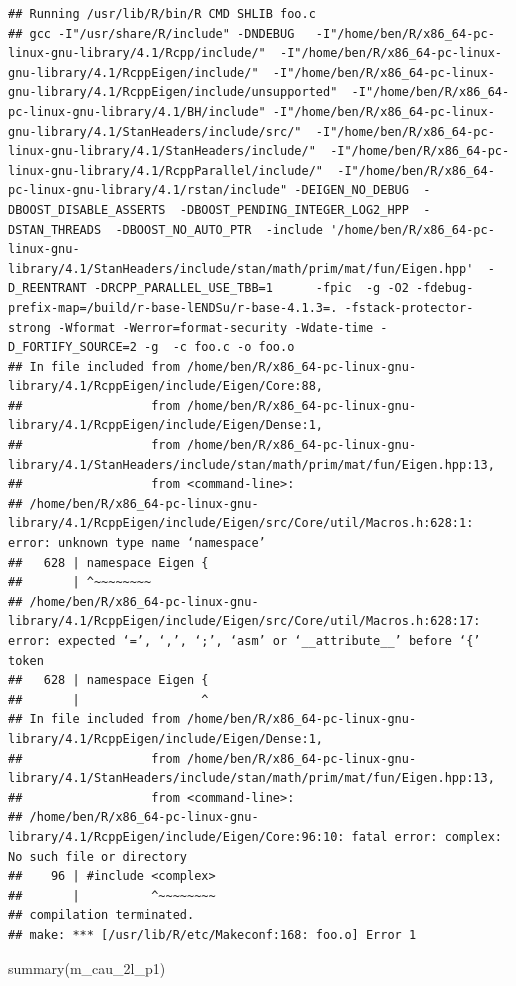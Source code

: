 \documentclass[
]{article}
\newenvironment{Shaded}{\begin{snugshade}}{\end{snugshade}}
\newcommand{\FunctionTok}[1]{\textcolor[rgb]{0.00,0.00,0.00}{#1}}
\newcommand{\NormalTok}[1]{#1}
\begin{document}
\begin{verbatim}
## Running /usr/lib/R/bin/R CMD SHLIB foo.c
## gcc -I"/usr/share/R/include" -DNDEBUG   -I"/home/ben/R/x86_64-pc-linux-gnu-library/4.1/Rcpp/include/"  -I"/home/ben/R/x86_64-pc-linux-gnu-library/4.1/RcppEigen/include/"  -I"/home/ben/R/x86_64-pc-linux-gnu-library/4.1/RcppEigen/include/unsupported"  -I"/home/ben/R/x86_64-pc-linux-gnu-library/4.1/BH/include" -I"/home/ben/R/x86_64-pc-linux-gnu-library/4.1/StanHeaders/include/src/"  -I"/home/ben/R/x86_64-pc-linux-gnu-library/4.1/StanHeaders/include/"  -I"/home/ben/R/x86_64-pc-linux-gnu-library/4.1/RcppParallel/include/"  -I"/home/ben/R/x86_64-pc-linux-gnu-library/4.1/rstan/include" -DEIGEN_NO_DEBUG  -DBOOST_DISABLE_ASSERTS  -DBOOST_PENDING_INTEGER_LOG2_HPP  -DSTAN_THREADS  -DBOOST_NO_AUTO_PTR  -include '/home/ben/R/x86_64-pc-linux-gnu-library/4.1/StanHeaders/include/stan/math/prim/mat/fun/Eigen.hpp'  -D_REENTRANT -DRCPP_PARALLEL_USE_TBB=1      -fpic  -g -O2 -fdebug-prefix-map=/build/r-base-lENDSu/r-base-4.1.3=. -fstack-protector-strong -Wformat -Werror=format-security -Wdate-time -D_FORTIFY_SOURCE=2 -g  -c foo.c -o foo.o
## In file included from /home/ben/R/x86_64-pc-linux-gnu-library/4.1/RcppEigen/include/Eigen/Core:88,
##                  from /home/ben/R/x86_64-pc-linux-gnu-library/4.1/RcppEigen/include/Eigen/Dense:1,
##                  from /home/ben/R/x86_64-pc-linux-gnu-library/4.1/StanHeaders/include/stan/math/prim/mat/fun/Eigen.hpp:13,
##                  from <command-line>:
## /home/ben/R/x86_64-pc-linux-gnu-library/4.1/RcppEigen/include/Eigen/src/Core/util/Macros.h:628:1: error: unknown type name ‘namespace’
##   628 | namespace Eigen {
##       | ^~~~~~~~~
## /home/ben/R/x86_64-pc-linux-gnu-library/4.1/RcppEigen/include/Eigen/src/Core/util/Macros.h:628:17: error: expected ‘=’, ‘,’, ‘;’, ‘asm’ or ‘__attribute__’ before ‘{’ token
##   628 | namespace Eigen {
##       |                 ^
## In file included from /home/ben/R/x86_64-pc-linux-gnu-library/4.1/RcppEigen/include/Eigen/Dense:1,
##                  from /home/ben/R/x86_64-pc-linux-gnu-library/4.1/StanHeaders/include/stan/math/prim/mat/fun/Eigen.hpp:13,
##                  from <command-line>:
## /home/ben/R/x86_64-pc-linux-gnu-library/4.1/RcppEigen/include/Eigen/Core:96:10: fatal error: complex: No such file or directory
##    96 | #include <complex>
##       |          ^~~~~~~~~
## compilation terminated.
## make: *** [/usr/lib/R/etc/Makeconf:168: foo.o] Error 1
\end{verbatim}

\begin{Shaded}
\begin{Highlighting}[]
\FunctionTok{summary}\NormalTok{(m\_cau\_2l\_p1)}
\end{Highlighting}
\end{Shaded}
\end{document}
